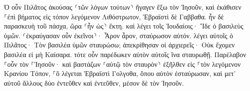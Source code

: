 \documentclass{openreader}
\begin{document}
Ὁ οὖν Πιλᾶτος ἀκούσας ⸂τῶν λόγων τούτων⸃ ἤγαγεν ἔξω τὸν Ἰησοῦν, καὶ ἐκάθισεν ⸀ἐπὶ βήματος εἰς τόπον λεγόμενον Λιθόστρωτον, Ἑβραϊστὶ δὲ Γαββαθα. 
ἦν δὲ παρασκευὴ τοῦ πάσχα, ὥρα ⸂ἦν ὡς⸃ ἕκτη. καὶ λέγει τοῖς Ἰουδαίοις· Ἴδε ὁ βασιλεὺς ὑμῶν. 
⸂ἐκραύγασαν οὖν ἐκεῖνοι⸃· Ἆρον ἆρον, σταύρωσον αὐτόν. λέγει αὐτοῖς ὁ Πιλᾶτος· Τὸν βασιλέα ὑμῶν σταυρώσω; ἀπεκρίθησαν οἱ ἀρχιερεῖς· Οὐκ ἔχομεν βασιλέα εἰ μὴ Καίσαρα. 
τότε οὖν παρέδωκεν αὐτὸν αὐτοῖς ἵνα σταυρωθῇ. Παρέλαβον ⸀οὖν τὸν ⸀Ἰησοῦν· 
καὶ βαστάζων ⸂αὑτῷ τὸν σταυρὸν⸃ ἐξῆλθεν εἰς ⸀τὸν λεγόμενον Κρανίου Τόπον, ⸀ὃ λέγεται Ἑβραϊστὶ Γολγοθα, 
ὅπου αὐτὸν ἐσταύρωσαν, καὶ μετ’ αὐτοῦ ἄλλους δύο ἐντεῦθεν καὶ ἐντεῦθεν, μέσον δὲ τὸν Ἰησοῦν. 
\end{document}

